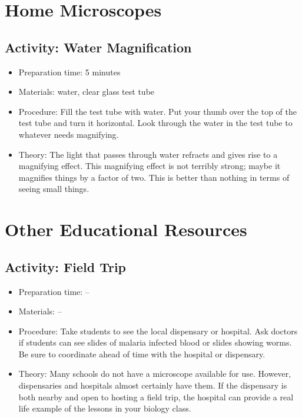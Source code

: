 \section{Home Microscopes}

\subsection{Activity: Water Magnification}
\begin{itemize}
\item{Preparation time: 5 minutes}
\item{Materials: water, clear glass test tube}
\item{Procedure: Fill the test tube with water. Put your thumb over the top of the test tube and turn it horizontal. Look through the water in the test tube to whatever needs magnifying.}
\item{Theory: The light that passes through water refracts and gives rise to a magnifying effect. This magnifying effect is not terribly strong; maybe it magnifies things by a factor of two. This is better than nothing in terms of seeing small things.}
\end{itemize}

\section{Other Educational Resources}

\subsection{Activity: Field Trip}
\begin{itemize}
\item{Preparation time: --}
\item{Materials: --}
\item{Procedure: Take students to see the local dispensary or hospital. Ask doctors if students can see slides of malaria infected blood or slides showing worms. Be sure to coordinate ahead of time with the hospital or dispensary. }
\item{Theory: Many schools do not have a microscope available for use. However, dispensaries and hospitals almost certainly have them. If the dispensary is both nearby and open to hosting a field trip, the hospital can provide a real life example of the lessons in your biology class. }
\end{itemize}

